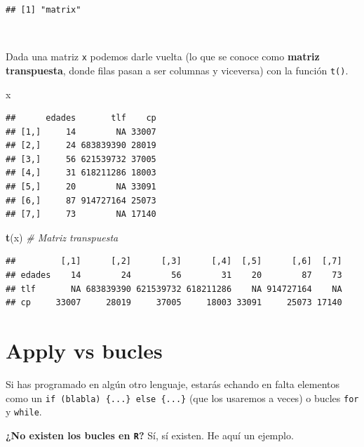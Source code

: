 \documentclass[11pt,]{book}
\newenvironment{Shaded}{\begin{snugshade}}{\end{snugshade}}
\newcommand{\CommentTok}[1]{\textcolor[rgb]{0.37,0.37,0.37}{\textit{#1}}}
\newcommand{\KeywordTok}[1]{\textcolor[rgb]{0.27,0.27,0.27}{\textbf{#1}}}
\newcommand{\NormalTok}[1]{#1}
\begin{document}
\begin{verbatim}
## [1] "matrix"
\end{verbatim}

~

Dada una matriz \texttt{x} podemos darle vuelta (lo que se conoce como \textbf{matriz transpuesta}, donde filas pasan a ser columnas y viceversa) con la función \texttt{t()}.

\begin{Shaded}
\begin{Highlighting}[]
\NormalTok{x}
\end{Highlighting}
\end{Shaded}

\begin{verbatim}
##      edades       tlf    cp
## [1,]     14        NA 33007
## [2,]     24 683839390 28019
## [3,]     56 621539732 37005
## [4,]     31 618211286 18003
## [5,]     20        NA 33091
## [6,]     87 914727164 25073
## [7,]     73        NA 17140
\end{verbatim}

\begin{Shaded}
\begin{Highlighting}[]
\KeywordTok{t}\NormalTok{(x) }\CommentTok{# Matriz transpuesta}
\end{Highlighting}
\end{Shaded}

\begin{verbatim}
##         [,1]      [,2]      [,3]      [,4]  [,5]      [,6]  [,7]
## edades    14        24        56        31    20        87    73
## tlf       NA 683839390 621539732 618211286    NA 914727164    NA
## cp     33007     28019     37005     18003 33091     25073 17140
\end{verbatim}

\hypertarget{apply-vs-bucles}{%
\section{Apply vs bucles}\label{apply-vs-bucles}}

Si has programado en algún otro lenguaje, estarás echando en falta elementos como un \texttt{if\ (blabla)\ \{...\}\ else\ \{...\}} (que los usaremos a veces) o bucles \texttt{for} y \texttt{while}.

\textbf{¿No existen los bucles en \texttt{R}?} Sí, sí existen. He aquí un ejemplo.
\end{document}
